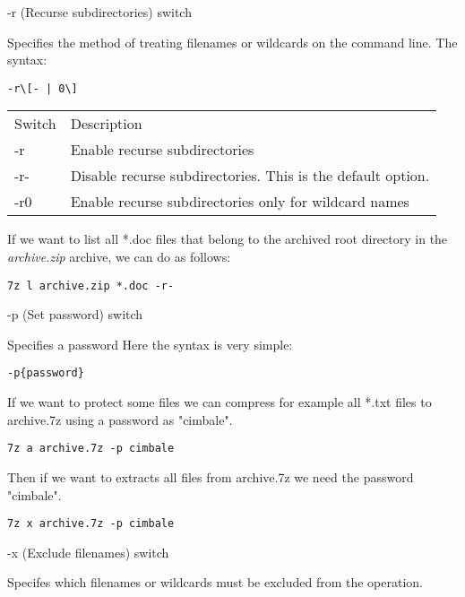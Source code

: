 \documentclass[hidelinks,12pt,a4paper,numbers=enddot]{scrartcl}
\begin{document}
-r (Recurse subdirectories) switch


Specifies the method of treating filenames or wildcards on the command line.
The syntax:

\begin{verbatim}
-r\[- | 0\]
\end{verbatim}

\begin{table}[h]
\begin{tabular}{ll}
    Switch &Description \\
    -r &Enable recurse subdirectories \\
    -r- &Disable recurse subdirectories. This is the default option. \\
    -r0 & Enable recurse subdirectories only for wildcard names  \\
\end{tabular}
\end{table}



If we want to list all *.doc files that belong to the archived root directory in
the \emph{archive.zip} archive, we can do as follows:


\begin{verbatim}
7z l archive.zip *.doc -r-
\end{verbatim}

-p (Set password) switch


Specifies a password
Here the syntax is very simple:

\begin{verbatim}
-p{password}
\end{verbatim}

If we want to protect some files we can compress for example all *.txt files
to archive.7z using a password as "cimbale".

\begin{verbatim}
7z a archive.7z -p cimbale
\end{verbatim}

Then if we want to extracts all files from archive.7z we need the password "cimbale".

\begin{verbatim}
7z x archive.7z -p cimbale
\end{verbatim}

-x (Exclude filenames) switch 



Specifes which filenames or wildcards must be excluded from the operation.
\end{document}

